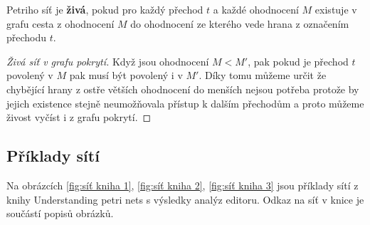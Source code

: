 \documentclass[
  biblatex,
  glossaries,
  printversion
]{kidiplom}
\begin{document}
Petriho síť je \textbf{živá}, pokud 
pro každý přechod $t$ a každé ohodnocení $M$ existuje v grafu cesta
z ohodnocení $M$ do ohodnocení ze kterého vede hrana z označením přechodu $t$.
\begin{proof}[Živá síť v grafu pokrytí]
 Když jsou ohodnocení $M < M'$, pak pokud je přechod $t$ 
  povolený v $M$ pak musí být povolený i v $M'$. Díky tomu můžeme určit
  že chybějící hrany z ostře větších ohodnocení do menších nejsou potřeba protože 
  by jejich existence stejně neumožňovala přístup k dalším přechodům a proto můžeme 
  živost vyčíst i z grafu pokrytí.
\end{proof}


\subsection{Příklady sítí}
Na obrázcích \ref{fig:síť kniha 1}, \ref{fig:síť kniha 2}, \ref{fig:síť kniha 3} jsou příklady sítí z knihy Understanding petri nets\cite{reisig2013understanding} 
s výsledky analýz editoru.
Odkaz na síť v knice je součástí popisů obrázků.
\end{document}
